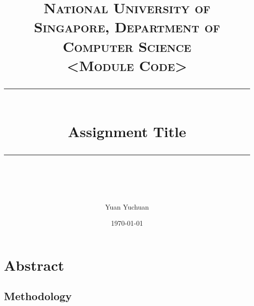 


%


\newcommand{\horrule}[1]{\rule{\linewidth}{#1}} %

\title{
\normalfont \normalsize
\textsc{National University of Singapore, Department of Computer Science\\
		<Module Code>} \\ [25pt]
\horrule{0.5pt} \\[0.4cm] %
\huge Assignment Title \\ %
\horrule{2pt} \\[0.5cm] %
}

\author{Yuan Yuchuan} %

\date{
  \today
}



\maketitle %

\section{Abstract}

\subsection{Methodology}


